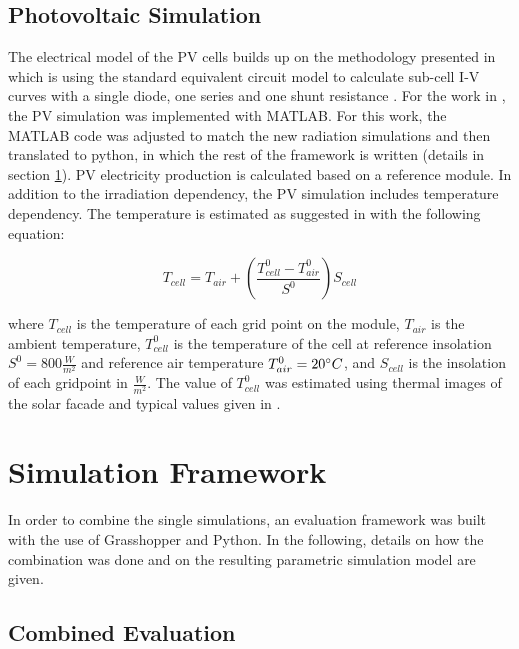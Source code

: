 		\subsection{Photovoltaic Simulation}
			The electrical model of the PV cells builds up on the methodology presented in \cite{hofer2015PVSEC} which is using the standard equivalent circuit model to calculate sub-cell I-V curves with a single diode, one series and one shunt resistance \cite{mermoud2010}. For the work in \cite{hofer2015PVSEC}, the PV simulation was implemented with MATLAB. For this work, the MATLAB code was adjusted to match the new radiation simulations and then translated to python, in which the rest of the framework is written (details in section \ref{s:simulationFramework}). PV electricity production is calculated based on a reference module. In addition to the irradiation dependency, the PV simulation includes temperature dependency. The temperature is estimated as suggested in \cite{Ross_Smokler_1986} with the following equation:

			\begin{equation}
				T_{cell} = T_{air} + \left(\frac{T_{cell}^0-T_{air}^0}{S^0}\right)S_{cell}
	      		\label{e:temp}
			\end{equation}

			where $T_{cell}$ is the temperature of each grid point on the module, $T_{air}$ is the ambient temperature, $T_{cell}^0$ is the temperature of the cell at reference insolation $S^0=800\frac{W}{m^2}$ and reference air temperature $T_{air}^0=20\degree C$, and $S_{cell}$ is the insolation of each gridpoint in $\frac{W}{m^2}$. The value of $T_{cell}^0$ was estimated using thermal images of the solar facade and typical values given in \cite{Ross_Smokler_1986}. 



	\section{Simulation Framework}
	\label{s:simulationFramework}
		In order to combine the single simulations, an evaluation framework was built with the use of Grasshopper and Python. In the following, details on how the combination was done and on the resulting parametric simulation model are given.

		\subsection{Combined Evaluation}

